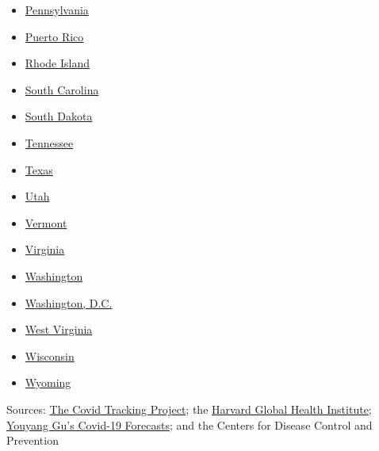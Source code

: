 \begin{itemize}
\item
  \href{https://www.nytimes.com/interactive/2020/us/pennsylvania-coronavirus-cases.html}{Pennsylvania}
\item
  \href{https://www.nytimes.com/interactive/2020/us/puerto-rico-coronavirus-cases.html}{Puerto
  Rico}
\item
  \href{https://www.nytimes.com/interactive/2020/us/rhode-island-coronavirus-cases.html}{Rhode
  Island}
\item
  \href{https://www.nytimes.com/interactive/2020/us/south-carolina-coronavirus-cases.html}{South
  Carolina}
\item
  \href{https://www.nytimes.com/interactive/2020/us/south-dakota-coronavirus-cases.html}{South
  Dakota}
\item
  \href{https://www.nytimes.com/interactive/2020/us/tennessee-coronavirus-cases.html}{Tennessee}
\item
  \href{https://www.nytimes.com/interactive/2020/us/texas-coronavirus-cases.html}{Texas}
\item
  \href{https://www.nytimes.com/interactive/2020/us/utah-coronavirus-cases.html}{Utah}
\item
  \href{https://www.nytimes.com/interactive/2020/us/vermont-coronavirus-cases.html}{Vermont}
\item
  \href{https://www.nytimes.com/interactive/2020/us/virginia-coronavirus-cases.html}{Virginia}
\item
  \href{https://www.nytimes.com/interactive/2020/us/washington-coronavirus-cases.html}{Washington}
\item
  \href{https://www.nytimes.com/interactive/2020/us/washington-dc-coronavirus-cases.html}{Washington,
  D.C.}
\item
  \href{https://www.nytimes.com/interactive/2020/us/west-virginia-coronavirus-cases.html}{West
  Virginia}
\item
  \href{https://www.nytimes.com/interactive/2020/us/wisconsin-coronavirus-cases.html}{Wisconsin}
\item
  \href{https://www.nytimes.com/interactive/2020/us/wyoming-coronavirus-cases.html}{Wyoming}
\end{itemize}

Sources: \href{https://covidtracking.com/}{The Covid Tracking Project};
the
\href{https://globalepidemics.org/july-6-2020-state-testing-targets/}{Harvard
Global Health Institute};
\href{https://github.com/youyanggu/covid19_projections}{Youyang Gu's
Cov}\href{https://github.com/youyanggu/covid19_projections}{id}\href{https://github.com/youyanggu/covid19_projections}{-19
Forecasts}; and the Centers for Disease Control and Prevention

